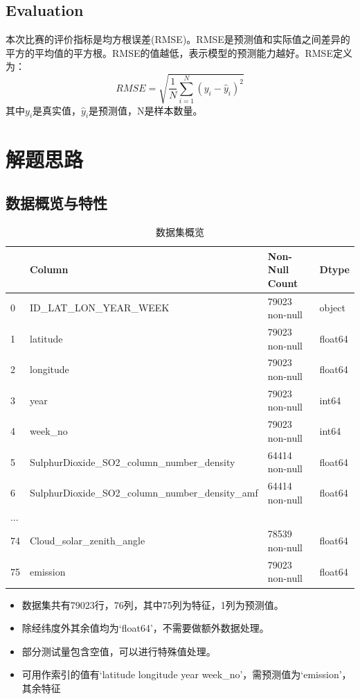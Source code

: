 \documentclass[fontset=windows]{article}
\begin{document}
\subsection{Evaluation}

本次比赛的评价指标是均方根误差(RMSE)。RMSE是预测值和实际值之间差异的平方的平均值的平方根。RMSE的值越低，表示模型的预测能力越好。RMSE定义为：$$RMSE=\sqrt{\frac{1}{N}\sum\limits_{i=1}^{N}(y_i-\hat y_i)^2}$$其中$y_i$是真实值，$\hat y_i$是预测值，N是样本数量。

\section{解题思路}

\subsection{数据概览与特性}

\begin{table}[h]
      \centering
      \begin{tabular}{|l|l|l|l|}
      \hline
          \ & Column & Non-Null Count & Dtype \\ \hline
          0 & ID\_LAT\_LON\_YEAR\_WEEK & 79023 non-null & object \\ \hline
          1 & latitude & 79023 non-null & float64 \\ \hline
          2 & longitude & 79023 non-null & float64 \\ \hline
          3 & year & 79023 non-null & int64 \\ \hline
          4 & week\_no & 79023 non-null & int64 \\ \hline
          5 & SulphurDioxide\_SO2\_column\_number\_density & 64414 non-null & float64 \\ \hline
          6 & SulphurDioxide\_SO2\_column\_number\_density\_amf & 64414 non-null & float64 \\ \hline
          ... & ~ & ~ & ~ \\ \hline
          74 & Cloud\_solar\_zenith\_angle & 78539 non-null & float64 \\ \hline
          75 & emission & 79023 non-null & float64 \\ \hline
      \end{tabular}
      \caption{数据集概览}
\end{table}

\begin{itemize}
      \item 数据集共有79023行，76列，其中75列为特征，1列为预测值。
      \item 除经纬度外其余值均为`float64'，不需要做额外数据处理。
      \item 部分测试量包含空值，可以进行特殊值处理。
      \item 可用作索引的值有`latitude longitude year week\_no'，需预测值为`emission'，其余特征
\end{itemize}
\end{document}
